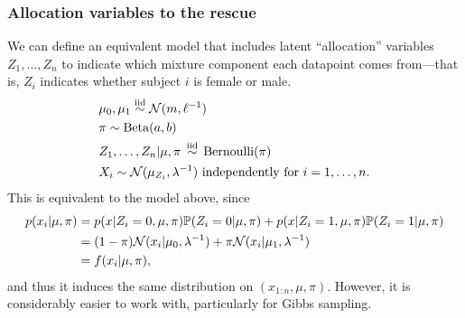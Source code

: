 \documentclass[12pt]{article}
\begin{document}
\subsubsection{Allocation variables to the rescue}
We can define an equivalent model that includes latent ``allocation'' variables $Z_1,\ldots,Z_n$ to indicate which mixture component each datapoint
comes from---that is, $Z_i$ indicates whether subject $i$ is female or male.
\begin{align*}
    & \mu_0,\mu_1 \stackrel{\mathrm{iid}}{\sim} \mathcal{N}(m,\ell^{-1})\\
    & \pi \sim \operatorname*{Beta}(a,b)\\
    & Z_1,\ldots,Z_n|\mu,\pi\,\stackrel{\mathrm{iid}}{\sim}\,\operatorname*{Bernoulli}(\pi)\\
    & X_i\sim\mathcal{N}(\mu_{Z_i},\lambda^{-1}) \text{ independently for } i=1,\ldots,n.
\end{align*}
This is equivalent to the model above, since
\begin{align*}
    p(x_i|\mu,\pi) &= p(x|Z_i=0,\mu,\pi)\mathbb{P}(Z_i=0|\mu,\pi) 
                    + p(x|Z_i=1,\mu,\pi)\mathbb{P}(Z_i=1|\mu,\pi) \\
            &= (1-\pi)\mathcal{N}(x_i|\mu_0,\lambda^{-1}) + \pi\mathcal{N}(x_i|\mu_1,\lambda^{-1})\\
            &= f(x_i|\mu,\pi),
\end{align*}
and thus it induces the same distribution on $(x_{1:n},\mu,\pi)$. However, it is considerably easier to work with, particularly for Gibbs
sampling. 
\end{document}
